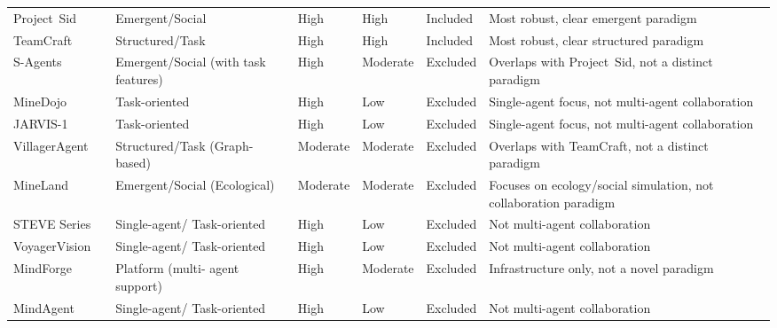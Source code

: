 \documentclass[a4paper, 12pt]{article}
\begin{document}
\begin{landscape}
\begin{longtable}{p{2.5cm} p{1cm} p{3.5cm} p{3cm} p{3cm} p{2cm} p{6.8cm}}
    Project~Sid & \citeyear{Altera2024} & Emergent/Social & High & High & Included & Most robust, clear emergent paradigm \\
    TeamCraft & \citeyear{Long2024} & Structured/Task & High & High & Included & Most robust, clear structured paradigm \\
    S-Agents & \citeyear{Chen2024} & Emergent/Social (with task features) & High & Moderate & Excluded & Overlaps with Project~Sid, not a distinct paradigm \\
    MineDojo & \citeyear{Fan2022} & Task-oriented & High & Low & Excluded & Single-agent focus, not multi-agent collaboration \\
    JARVIS-1 & \citeyear{Wang2025} & Task-oriented & High & Low & Excluded & Single-agent focus, not multi-agent collaboration \\
    VillagerAgent & \citeyear{Dong2024} & Structured/Task (Graph-based) & Moderate & Moderate & Excluded & Overlaps with TeamCraft, not a distinct paradigm \\
    MineLand & \citeyear{Yu2024} & Emergent/Social (Ecological) & Moderate & Moderate & Excluded & Focuses on ecology/social simulation, not collaboration paradigm \\
    STEVE Series & \citeyear{Zhao2024} & Single-agent/ \newline Task-oriented & High & Low & Excluded & Not multi-agent collaboration \\
    VoyagerVision & \citeyear{Smyth2025} & Single-agent/ \newline Task-oriented & High & Low & Excluded & Not multi-agent collaboration \\
    MindForge & \citeyear{Lica2024} & Platform (multi- \newline agent support) & High & Moderate & Excluded & Infrastructure only, not a novel paradigm \\
    MindAgent & \citeyear{Gong2023} & Single-agent/ \newline Task-oriented & High & Low & Excluded & Not multi-agent collaboration \\
\end{longtable}
\end{landscape}
\end{document}
